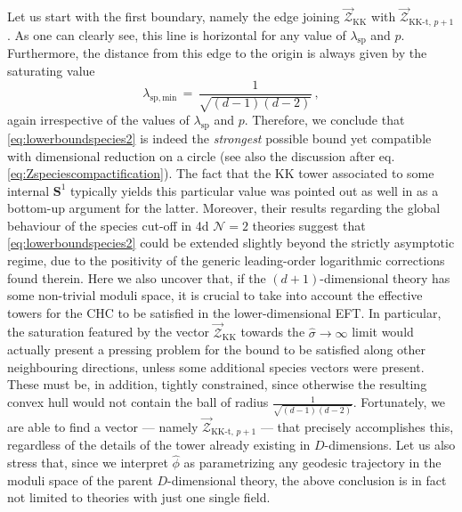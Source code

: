 Let us start with the first boundary, namely the edge joining $\vec{\mathcal{Z}}_{\text{KK}}$ with $\vec{\mathcal{Z}}_{\text{KK-t},\, p+1}$. As one can clearly see, this line is horizontal for any value of $\lambda_{\text{sp}}$ and $p$. Furthermore, the distance from this edge to the origin is always given by the saturating value
%
\begin{equation}\label{eq:lspmin}
    \lambda_{\text{sp}, \, \text{min}}\, =\, \frac {1}{\sqrt{(d-1)(d-2)}} \, ,
\end{equation}
%
again irrespective of the values of $\lambda_{\text{sp}}$ and $p$. Therefore, we conclude that \eqref{eq:lowerboundspecies2} is indeed the \emph{strongest} possible bound yet compatible with dimensional reduction on a circle (see also the discussion after eq. \eqref{eq:Zspeciescompactification}). The fact that the KK tower associated to some internal $\mathbf{S}^1$ typically yields this particular value was pointed out as well in \cite{vandeHeisteeg:2023uxj} as a bottom-up argument for the latter. Moreover, their results regarding the global behaviour of the species cut-off in 4d $\mathcal{N}=2$ theories suggest that \eqref{eq:lowerboundspecies2} could be extended slightly beyond the strictly asymptotic regime, due to the positivity of the generic leading-order logarithmic corrections found therein. Here we also uncover that, if the $(d+1)$-dimensional theory has some non-trivial moduli space, it is crucial to take into account the effective towers for the CHC to be satisfied in the lower-dimensional EFT. In particular, the saturation featured by the vector $\vec{\mathcal{Z}}_{\text{KK}}$ towards the $\hat \sigma \to \infty$ limit would actually present a pressing problem for the bound to be satisfied along other neighbouring directions, unless some additional species vectors were present. These must be, in addition, tightly constrained, since otherwise the resulting convex hull would not contain the ball of radius $\frac {1}{\sqrt{(d-1)(d-2)}}$. Fortunately, we are able to find a vector --- namely $\vec{\mathcal{Z}}_{\text{KK-t},\, p+1}$ --- that precisely accomplishes this, regardless of the details of the tower already existing in $D$-dimensions. Let us also stress that, since we interpret $\hat \phi$ as parametrizing any geodesic trajectory in the moduli space of the parent $D$-dimensional theory, the above conclusion is in fact not limited to theories with just one single field. %

